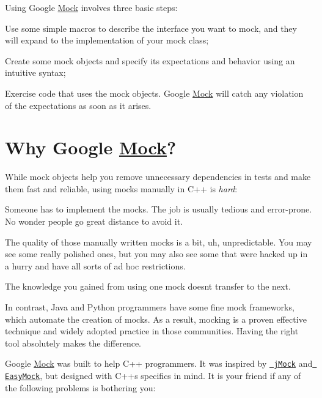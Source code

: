Using Google \mbox{\hyperlink{class_mock}{Mock}} involves three basic steps\+:


\begin{DoxyEnumerate}
\item Use some simple macros to describe the interface you want to mock, and they will expand to the implementation of your mock class;
\end{DoxyEnumerate}
\begin{DoxyEnumerate}
\item Create some mock objects and specify its expectations and behavior using an intuitive syntax;
\end{DoxyEnumerate}
\begin{DoxyEnumerate}
\item Exercise code that uses the mock objects. Google \mbox{\hyperlink{class_mock}{Mock}} will catch any violation of the expectations as soon as it arises.
\end{DoxyEnumerate}

\section*{Why Google \mbox{\hyperlink{class_mock}{Mock}}?}

While mock objects help you remove unnecessary dependencies in tests and make them fast and reliable, using mocks manually in C++ is {\itshape hard}\+:


\begin{DoxyItemize}
\item Someone has to implement the mocks. The job is usually tedious and error-\/prone. No wonder people go great distance to avoid it.
\item The quality of those manually written mocks is a bit, uh, unpredictable. You may see some really polished ones, but you may also see some that were hacked up in a hurry and have all sorts of ad hoc restrictions.
\item The knowledge you gained from using one mock doesn\textquotesingle{}t transfer to the next.
\end{DoxyItemize}

In contrast, Java and Python programmers have some fine mock frameworks, which automate the creation of mocks. As a result, mocking is a proven effective technique and widely adopted practice in those communities. Having the right tool absolutely makes the difference.

Google \mbox{\hyperlink{class_mock}{Mock}} was built to help C++ programmers. It was inspired by \href{http://www.jmock.org/}\texttt{ j\+Mock} and \href{http://www.easymock.org/}\texttt{ Easy\+Mock}, but designed with C++\textquotesingle{}s specifics in mind. It is your friend if any of the following problems is bothering you\+:


